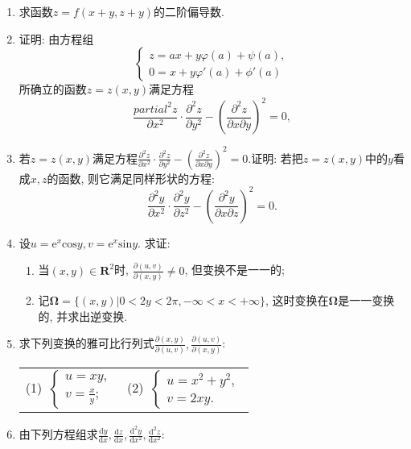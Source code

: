 \begin{enumerate}
\item 求函数$z=f(x+y,z+y)$的二阶偏导数. 
\item 证明: 由方程组
$$\begin{cases}
z = ax+y\varphi(a)+\psi(a),\\
0 = x + y \varphi'(a)+\phi'(a)
\end{cases}$$
所确立的函数$z=z(x,y)$满足方程
$$ \frac{partial^2 z}{\partial x^2}\cdot\frac{\partial^2 z}{\partial y^2}-(\frac{\partial^2 z}{\partial x \partial y})^2 = 0,$$
\item 若$z=z(x,y)$满足方程$\frac{\partial^2 z}{\partial x^2}\cdot \frac{\partial^2z}{\partial y^2}-(\frac{\partial^2z}{\partial x\partial y})^2=0$.证明: 若把$z=z(x,y)$中的$y$看成$x,z$的函数, 则它满足同样形状的方程:
$$\frac{\partial^2 y}{\partial x^2}\cdot\frac{\partial^2 y}{\partial z^2} - (\frac{\partial^2 y}{\partial x \partial z})^2 = 0.$$
\item 设$u=\mathrm{e}^x\mathrm{cos}y, v = \mathrm{e}^x\mathrm{sin}y$. 求证:
\begin{enumerate}
\item 当$(x,y)\in \bm{R}^2$时, $\frac{\partial (u,v)}{\partial (x,y)}\ne 0$, 但变换不是一一的;
\item 记$\bm{\Omega}=\{(x,y)|0<2y<2\pi, -\infty<x<+\infty\}$, 这时变换在$\bm{\Omega}$是一一变换的, 并求出逆变换.
\end{enumerate}
\item 求下列变换的雅可比行列式$\frac{\partial(x,y)}{\partial (u,v)}, \frac{\partial (u,v)}{\partial (x,y)}$:
\begin{table}[H]
	\begin{tabular}{lr}
		\qquad \qquad (1)\ $\begin{cases}
			u=xy,\\
			v=\frac{x}{y};
		\end{cases}$ & \qquad \qquad \qquad \qquad \qquad  (2)\ $\begin{cases}
		u=x^2+y^2,\\
		v=2xy.
		\end{cases}$
	\end{tabular}
\end{table}
\item 由下列方程组求$\frac{\mathrm{d}y}{\mathrm{d}x},\frac{\mathrm{d}z}{\mathrm{d}x},\frac{\mathrm{d}^2y}{\mathrm{d}x^2},\frac{\mathrm{d}^2z}{\mathrm{d}x^2}$:
\begin{table}[H]
\end{table}
\end{enumerate}
